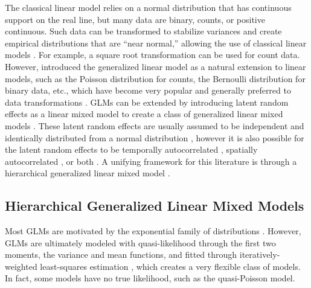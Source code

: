 \documentclass[12pt, titlepage]{article}
\begin{document}
The classical linear model relies on a normal distribution that has continuous support on the real line, but many data are binary, counts, or positive continuous.  Such data can be transformed to stabilize variances and create empirical distributions that are ``near normal,'' allowing the use of classical linear models \citep[e.g.,][ p. 288]{SnedecorEtAl1980StatisticalMethodsSeventh}. For example, a square root transformation can be used for count data.  However, \citet{NelderEtAl1972GeneralizedLinearModels370} introduced the generalized linear model \citep[GLM,][]{McCullaghEtAl1989GeneralizedLinearModels} as a natural extension to linear models, such as the Poisson distribution for counts, the Bernoulli distribution for binary data, etc., which have become very popular and generally preferred to data transformations \citep[e.g.,][]{warton_arcsine_2011}.  GLMs can be extended by introducing latent random effects as a linear mixed model to create a class of generalized linear mixed models \citep[GLMM,][]{breslow_approximate_1993}.  These latent random effects are usually assumed to be independent and identically distributed from a normal distribution \citep{zeger_generalized_1991}, however it is also possible for the latent random effects to be temporally autocorrelated \citep[e.g.,][]{stiratelli_random-effects_1984, zeger_models_1988}, spatially autocorrelated \citep[e.g,][]{clayton_empirical_1987, GotwayEtAl1997GeneralizedLinearModel157, DiggleEtAl1998ModelbasedGeostatisticsDisc299}, or both \citep[][p. 380]{CressieEtAl2011StatisticsSpatiotemporalData}.  A unifying framework for this literature is through a hierarchical generalized linear mixed model \citep[HGLMM,][]{lee_hierarchical_1996}.


\subsection{Hierarchical Generalized Linear Mixed Models}

Most GLMs are motivated by the exponential family of distributions \citep[e.g.,][]{fisher_two_1934, lehmann_theory_2006}.  However, GLMs are ultimately modeled with quasi-likelihood through the first two moments, the variance and mean functions,  and fitted through iteratively-weighted least-squares estimation \citep{wedderburn_quasi-likelihood_1974}, which creates a very flexible class of models. In fact, some models have no true likelihood, such as the quasi-Poisson model.
\end{document}
